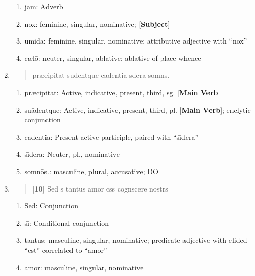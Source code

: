 \documentclass[]{article}
\newcommand{\latify}[1]{
        \Large
        \begin{verse}
          \begin{metrica}
          {#1}\\
          \end{metrica}
        \end{verse}
        \normalsize
}
\begin{document}
\begin{enumerate}
\begin{enumerate}
	\item jam:  Adverb

	\item nox:  feminine, singular, nominative; [\textbf{Subject}]

	\item \={u}mida:  feminine, singular, nominative; attributive adjective with ``nox''

	\item c{\ae}l\={o}:  neuter, singular, ablative; ablative of place whence
\end{enumerate}


\item \latify{pr{\ae}cipitat su{}dentque cadentia s{\macron {\i}}dera somn{\macron {o}}s.}         

\begin{enumerate}

	\item pr{\ae}cipitat:    Active, indicative, present, third, sg. [\textbf{Main Verb}]

	\item su\={a}dentque:     Active, indicative, present, third, pl. [\textbf{Main Verb}]; enclytic conjunction

	\item cadentia:  Present active participle, paired with ``s\={\i}dera''

	\item s\={\i}dera:  Neuter, pl., nominative

	\item somn\={o}s.: masculine, plural, accusative; DO

\end{enumerate}

\item \latify{[\textbf{10}] Sed s{\macron {\i}} tantus amor c{\macron {a}}s{\macron {u}}s cogn{\macron {o}}scere nostr{\macron {o}}s }
\begin{enumerate}

	\item Sed:  Conjunction

	\item s\={\i}:  Conditional conjunction

	\item tantus: masculine, singular, nominative; predicate adjective with elided ``est'' correlated to ``amor''

	\item amor:  masculine, singular, nominative


\end{enumerate}
\end{enumerate}
\end{document}
